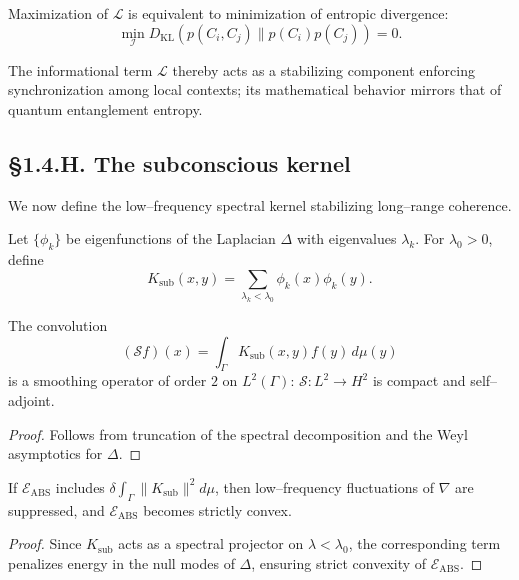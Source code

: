 \begin{corollary}
Maximization of $\mathcal L$ is equivalent to minimization of entropic divergence:
\[
\min_{\mathcal I} D_{\mathrm{KL}}(p(C_i,C_j)\|p(C_i)p(C_j)) = 0.
\]
\end{corollary}

\begin{remark}
The informational term $\mathcal L$ thereby acts as a stabilizing component enforcing synchronization among local contexts; its mathematical behavior mirrors that of quantum entanglement entropy.
\end{remark}

\subsection*{§1.4.H. The subconscious kernel}

We now define the low–frequency spectral kernel stabilizing long–range coherence.

\begin{definition}
Let $\{\phi_k\}$ be eigenfunctions of the Laplacian $\Delta$ with eigenvalues $\lambda_k$.  
For $\lambda_0>0$, define
\[
K_{\mathrm{sub}}(x,y)
 =\sum_{\lambda_k<\lambda_0}\phi_k(x)\phi_k(y).
\]
\end{definition}

\begin{lemma}\label{lem:1.4.sub}
The convolution
\[
(\mathcal S f)(x)=\int_\Gamma K_{\mathrm{sub}}(x,y)f(y)\,d\mu(y)
\]
is a smoothing operator of order $2$ on $L^2(\Gamma)$: $\mathcal S:L^2\to H^2$ is compact and self–adjoint.
\end{lemma}

\begin{proof}
Follows from truncation of the spectral decomposition and the Weyl asymptotics for $\Delta$.
\end{proof}

\begin{theorem}
If $\mathcal E_{\mathrm{ABS}}$ includes $\delta\int_\Gamma\|K_{\mathrm{sub}}\|^2 d\mu$, then low–frequency fluctuations of $\nabla$ are suppressed, and $\mathcal E_{\mathrm{ABS}}$ becomes strictly convex.
\end{theorem}

\begin{proof}
Since $K_{\mathrm{sub}}$ acts as a spectral projector on $\lambda<\lambda_0$, the corresponding term penalizes energy in the null modes of $\Delta$, ensuring strict convexity of $\mathcal E_{\mathrm{ABS}}$.
\end{proof}

